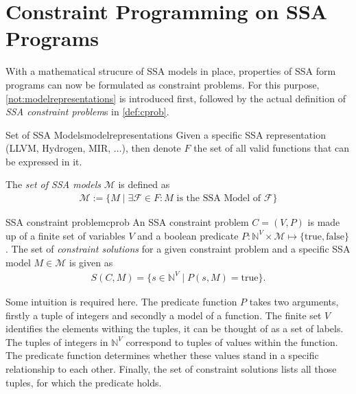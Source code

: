\newpage
\section{Constraint Programming on SSA Programs}

    With a mathematical strucure of SSA models in place, properties of SSA form
    programs can now be formulated as constraint problems.
    For this purpose, \autoref{not:modelrepresentations} is introduced first,
    followed by the actual definition of {\em SSA constraint problem}s in
    \autoref{def:cprob}.

\begin{notation}{Set of SSA Models}{modelrepresentations}
    Given a specific SSA representation (LLVM, Hydrogen, MIR, $\dots$), then
    denote $F$ the set of all valid functions that can be expressed in it.

    The {\em set of SSA models} $\mathcal M$ is defined as
    \begin{align*}
        \mathcal M := \{M\mid\exists\mathcal F\in F\colon M
                        \text{ is the SSA Model of }\mathcal F\}
    \end{align*}
\end{notation}

\begin{definition}{SSA constraint problem}{cprob}
    An SSA constraint problem $C=(V,P)$ is made up of a finite set of variables
    $V$ and a boolean predicate
    $P\colon\mathbb N^V\times\mathcal M\mapsto\{\text{true}, \text{false}\}$.
    The set of {\em constraint solutions} for a given constraint problem and a
    specific SSA model $M\in\mathcal M$ is given as
    \begin{align*}
        S(C,M) = \{s\in\mathbb N^V\mid P(s,M)=\text{true}\}.
    \end{align*}
\end{definition}

    Some intuition is required here.
    The predicate function $P$ takes two arguments, firstly a tuple of integers
    and secondly a model of a function.
    The finite set $V$ identifies the elements withing the tuples, it can be
    thought of as a set of labels.
    The tuples of integers in $\mathbb N^V$ correspond to tuples of values
    within the function.
    The predicate function determines whether these values stand in a specific
    relationship to each other.
    Finally, the set of constraint solutions lists all those tuples, for which
    the predicate holds.


